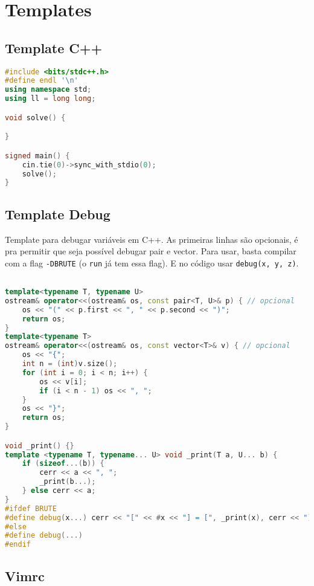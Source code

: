 \chapter{Templates}

\section{Template C++}

\begin{lstlisting}[language=C++]
#include <bits/stdc++.h>
#define endl '\n'
using namespace std;
using ll = long long;

void solve() {

}

signed main() {
    cin.tie(0)->sync_with_stdio(0);
    solve();
}
\end{lstlisting}

\section{Template Debug}

Template para debugar variáveis em C++. As primeiras linhas são opcionais, é pra permitir que seja possível debugar pair e vector.
Para usar, basta compilar com a flag \texttt{-DBRUTE} (o \texttt{run} já tem essa flag). E no código usar \texttt{debug(x, y, z)}.

\begin{lstlisting}[language=C++]

template<typename T, typename U> 
ostream& operator<<(ostream& os, const pair<T, U>& p) { // opcional
    os << "(" << p.first << ", " << p.second << ")";
    return os;
}
template<typename T> 
ostream& operator<<(ostream& os, const vector<T>& v) { // opcional
    os << "{";
    int n = (int)v.size();
    for (int i = 0; i < n; i++) {
        os << v[i];
        if (i < n - 1) os << ", ";
    }
    os << "}";
    return os;
}

void _print() {}
template <typename T, typename... U> void _print(T a, U... b) {
    if (sizeof...(b)) {
        cerr << a << ", ";
        _print(b...);
    } else cerr << a;
}
#ifdef BRUTE
#define debug(x...) cerr << "[" << #x << "] = [", _print(x), cerr << "]" << endl
#else
#define debug(...)
#endif
\end{lstlisting}

\section{Vimrc}

